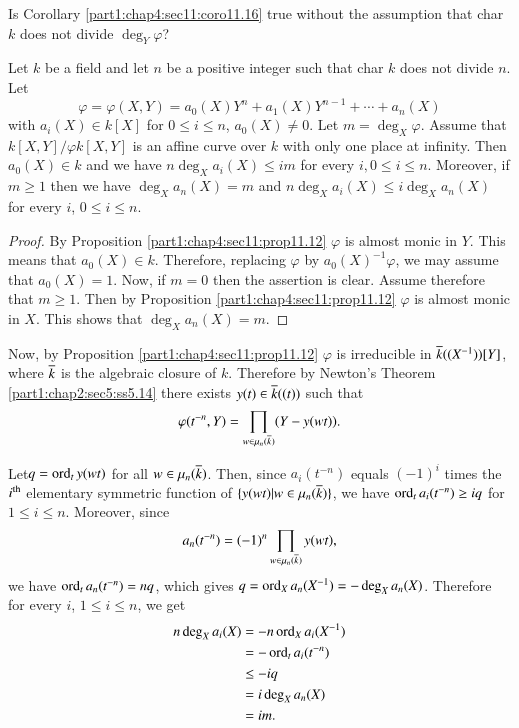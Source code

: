 \begin{qun}\label{part1:chap4:sec11:qun11.18}
  Is Corollary \ref{part1:chap4:sec11:coro11.16} true without the
  assumption that char $k$ does not divide $\deg_Y \varphi$?
\end{qun}

\begin{prop}\label{part1:chap4:sec11:prop11.19}
  Let $k$ be a field and let $n$ be a positive integer such that char
  $k$ does not divide $n$. Let
  $$
  \varphi = \varphi (X, Y)= a_0 (X) Y^n + a_1 (X) Y^{n-1}+ \cdots +
  a_n (X)
  $$
  with $a_i (X) \in k [X]$ for $0 \leq i \leq n$, $a_0 (X) \neq
  0$. Let $m= \deg_X \varphi$. Assume that $k[X, Y]/ \varphi k [X, Y]$
  is an affine curve over $k$ with only one place at infinity. Then
  $a_0 (X) \in k$ and we have $n \deg_X a_i (X) \leq im$ for every $i,
  0 \leq i \leq n$. Moreover, if $m \geq 1$ then we have $\deg_X a_n
  (X)=m$ and $n \deg_X a_i(X) \leq i \deg_X a_n (X)$ for every $i$, $0
  \leq i \leq n$.
\end{prop}

\begin{proof}
  By Proposition \ref{part1:chap4:sec11:prop11.12} $\varphi$ is almost
  monic in $Y$. This means that $a_0 (X) \in k$. Therefore, replacing
  $\varphi$ by $a_0 (X)^{-1} \varphi$, we may assume that $a_0
  (X)=1$. Now, if $m=0$ then the assertion is clear. Assume therefore
  that $m \geq 1$. Then by Proposition
  \ref{part1:chap4:sec11:prop11.12} $\varphi$ is almost monic in
  $X$. This shows that $\deg_X a_n (X)= m$.
\end{proof}

Now, by Proposition \ref{part1:chap4:sec11:prop11.12} $\varphi$ is
irreducible in $\overline{k} ((X^{-1})) [Y]$, where $\overline{k}$ is the
algebraic closure of $k$. Therefore by Newton's Theorem
\ref{part1:chap2:sec5:ss5.14} there exists $y(t) \in \overline{k} ((t))$
such that 
$$
\varphi (t^{-n}, Y) = \prod_{w \in \mu_n (\overline{k})} (Y- y(wt)).
$$

Let\pageoriginale $q = \operatorname{ord}_t y(wt)$ for all $w \in \mu_n (\overline{k})$. Then, since
$a_i(t^{-n})$ equals $(-1)^i$ times the $i^{\rm th}$ elementary symmetric
function of $\{ y (wt) | w \in \mu_n (\overline{k})\}$, we have $\operatorname{ord}_t a_i
(t^{-n}) \geq iq$ for $1 \leq i \leq n$. Moreover, since
$$
a_n (t^{-n})= (-1)^n \prod_{w \in \mu_n (\overline{k})} y (wt),
$$ 
we have $\operatorname{ord}_t a_n (t^{-n})= nq$, which gives $q = \ord_X a_n
(X^{-1})=- \deg_X\break a_n (X)$. Therefore for every $i$, $1 \leq i \leq
n$, we get
\begin{align*}
  n \deg_X a_i (X) & = -n \operatorname{ord}_X a_i (X^{-1})\\
  & = - \operatorname{ord}_t a_i (t^{-n})\\
  & \leq - iq\\
  & = i \deg_X a_n (X)\\
  & = im.
\end{align*}

